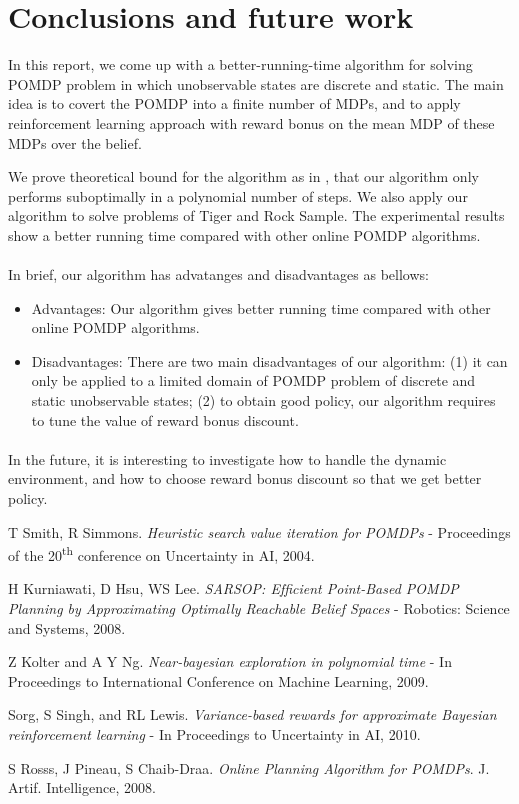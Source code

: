 \documentclass{article}
\begin{document}
\section{Conclusions and future work}

In this report, we come up with a better-running-time algorithm for solving POMDP problem in which unobservable states are discrete and static. The main idea is 
to covert the POMDP into a finite number of MDPs, and to apply reinforcement learning
approach with reward bonus on the mean MDP of these MDPs over the belief.

We prove theoretical bound for the algorithm as in \cite{kolter}, that our algorithm only
performs suboptimally in a polynomial number of steps. We also apply our algorithm to solve
problems of Tiger and Rock Sample. The experimental results show a better running time 
compared with other online POMDP algorithms.

\paragraph{} In brief, our algorithm has advatanges and disadvantages as bellows:
\begin{itemize}
\item Advantages: Our algorithm gives better running time compared with
other online POMDP algorithms.
\item Disadvantages: There are two main disadvantages of our algorithm: (1)
it can only be applied to a limited domain of POMDP problem of discrete and 
static unobservable states; (2) to obtain good policy, our algorithm requires
to tune the value of reward bonus discount.
\end{itemize}

\paragraph{} In the future, it is interesting to investigate how to handle the dynamic environment, and how to choose reward bonus discount so that we get better policy.


\begin{thebibliography}{9}

	T Smith, R Simmons. \emph{Heuristic search value iteration for POMDPs} - Proceedings of the 20\textsuperscript{th} conference on Uncertainty in AI, 2004.

	H Kurniawati, D Hsu, WS Lee. \emph{SARSOP: Efﬁcient Point-Based POMDP Planning by Approximating Optimally Reachable Belief Spaces} - Robotics: Science and Systems, 2008.

	Z Kolter and A Y Ng. \emph{Near-bayesian exploration in polynomial time} - In Proceedings to International Conference on Machine Learning, 2009.

	Sorg, S Singh, and RL Lewis. \emph{Variance-based rewards for approximate Bayesian reinforcement learning} - In Proceedings to Uncertainty in AI, 2010.

	S Rosss, J Pineau, S Chaib-Draa. \emph{Online Planning Algorithm for POMDPs}. J. Artif.
	Intelligence, 2008.

\end{thebibliography}
\end{document}
